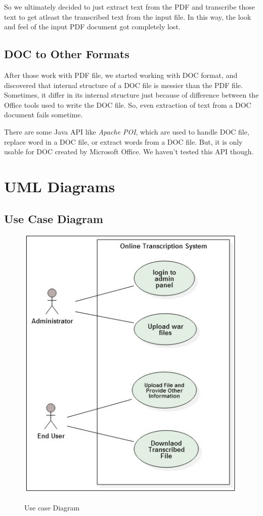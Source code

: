 \documentclass[12pt,oneside,openany,a4paper]{book}
\begin{document}
So we ultimately decided to just extract text from the PDF and transcribe those text to get atleast the transcribed text from the input file. In this way, the look and feel of the input PDF document got completely lost. 

\subsection{DOC to Other Formats}
After those work with PDF file, we started working with DOC format, and discovered that internal structure of a DOC file is messier than the PDF file. Sometimes, it differ in its internal structure just because of difference between the Office tools used to write the DOC file. So, even extraction of text from a DOC document fails sometime.

There are some Java API like \emph{Apache POI}, which are used to handle DOC file, replace word in a DOC file, or extract words from a DOC file. But, it is only usable for DOC created by Microsoft Office. We haven't tested this API though.

\section{UML Diagrams}
\subsection{Use Case Diagram}
\begin{figure}[H]
		\caption{Use case Diagram}
		\centering
		\includegraphics[scale=1.1]{usecase}
		\label{fig:usecasediagram}
\end{figure} 
\end{document}
